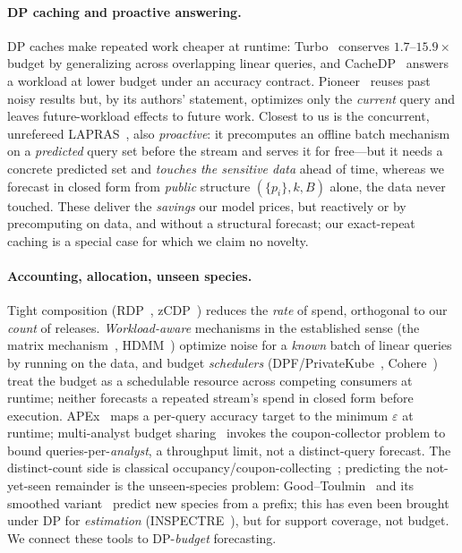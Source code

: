 \documentclass[runningheads]{llncs}
\newcommand{\eps}{\varepsilon}
\begin{document}
\paragraph{DP caching and proactive answering.} DP caches make repeated work cheaper at runtime: Turbo~\cite{kostopoulou2023turbo} conserves $1.7$--$15.9\times$ budget by generalizing across overlapping linear queries, and CacheDP~\cite{mazmudar2023cachedp} answers a workload at lower budget under an accuracy contract. Pioneer~\cite{peng2013pioneer} reuses past noisy results but, by its authors' statement, optimizes only the \emph{current} query and leaves future-workload effects to future work. Closest to us is the concurrent, unrefereed LAPRAS~\cite{mundra2026lapras}, also \emph{proactive}: it precomputes an offline batch mechanism on a \emph{predicted} query set before the stream and serves it for free---but it needs a concrete predicted set and \emph{touches the sensitive data} ahead of time, whereas we forecast in closed form from \emph{public} structure $(\{p_i\},k,B)$ alone, the data never touched. These deliver the \emph{savings} our model prices, but reactively or by precomputing on data, and without a structural forecast; our exact-repeat caching is a special case for which we claim no novelty.

\paragraph{Accounting, allocation, unseen species.} Tight composition (RDP~\cite{mironov2017renyi}, zCDP~\cite{bun2016concentrated}) reduces the \emph{rate} of spend, orthogonal to our \emph{count} of releases. \emph{Workload-aware} mechanisms in the established sense (the matrix mechanism~\cite{li2015matrix}, HDMM~\cite{mckenna2018hdmm}) optimize noise for a \emph{known} batch of linear queries by running on the data, and budget \emph{schedulers} (DPF/PrivateKube~\cite{luo2021dpf}, Cohere~\cite{kuchler2024cohere}) treat the budget as a schedulable resource across competing consumers at runtime; neither forecasts a repeated stream's spend in closed form before execution. APEx~\cite{ge2019apex} maps a per-query accuracy target to the minimum $\eps$ at runtime; multi-analyst budget sharing~\cite{pujol2023multianalyst} invokes the coupon-collector problem to bound queries-per-\emph{analyst}, a throughput limit, not a distinct-query forecast. The distinct-count side is classical occupancy/coupon-collecting~\cite{flajolet1992}; predicting the not-yet-seen remainder is the unseen-species problem: Good--Toulmin~\cite{goodtoulmin1956} and its smoothed variant~\cite{orlitsky2016unseen} predict new species from a prefix; this has even been brought under DP for \emph{estimation} (INSPECTRE~\cite{acharya2018inspectre}), but for support coverage, not budget. We connect these tools to DP-\emph{budget} forecasting.
\end{document}
